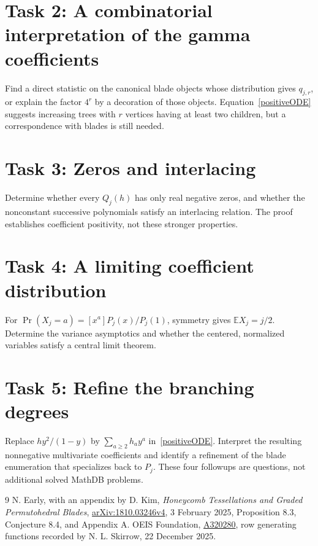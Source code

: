 \documentclass[11pt]{article}
\begin{document}
\section*{Task 2: A combinatorial interpretation of the gamma coefficients}
Find a direct statistic on the canonical blade objects whose distribution
gives $q_{j,r}$, or explain the factor $4^r$ by a decoration of those objects.
Equation~\eqref{positiveODE} suggests increasing trees with $r$ vertices
having at least two children, but a correspondence with blades is still needed.

\section*{Task 3: Zeros and interlacing}
Determine whether every $Q_j(h)$ has only real negative zeros, and whether
the nonconstant successive polynomials satisfy an interlacing relation.
The proof establishes coefficient positivity, not these stronger properties.

\section*{Task 4: A limiting coefficient distribution}
For $\Pr(X_j=a)=[x^a]P_j(x)/P_j(1)$, symmetry gives
$\mathbb E X_j=j/2$. Determine the variance asymptotics and whether the
centered, normalized variables satisfy a central limit theorem.

\section*{Task 5: Refine the branching degrees}
Replace $hy^2/(1-y)$ by $\sum_{a\geq2}h_a y^a$ in~\eqref{positiveODE}.
Interpret the resulting nonnegative multivariate coefficients and identify
a refinement of the blade enumeration that specializes back to $P_j$.
These four followups are questions, not additional solved MathDB problems.

\begin{thebibliography}{9}
 N. Early, with an appendix by D. Kim,
\emph{Honeycomb Tessellations and Graded Permutohedral Blades},
\href{https://arxiv.org/abs/1810.03246v4}{arXiv:1810.03246v4},
3 February 2025, Proposition 8.3, Conjecture 8.4, and Appendix A.
 OEIS Foundation, \href{https://oeis.org/A320280}{A320280},
row generating functions recorded by N. L. Skirrow, 22 December 2025.
\end{thebibliography}
\end{document}
